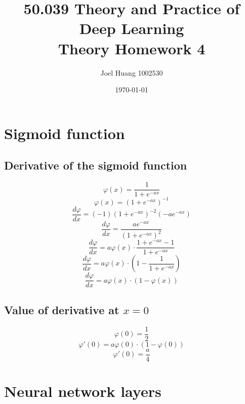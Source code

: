 \documentclass[twocolumn, 9pt]{article}
\title{
	50.039 Theory and Practice of Deep Learning\\
	Theory Homework 4
}
\author{Joel Huang 1002530}
\date{\today}
\begin{document}
\maketitle

\section{Sigmoid function}
\subsection*{Derivative of the sigmoid function}
\begin{equation*}
	\varphi(x) = \dfrac{1}{1+e^{-ax}}
\end{equation*}
\begin{equation*}
	\varphi(x) = (1+e^{-ax})^{-1}
\end{equation*}
\begin{equation*}
	\dfrac{d\varphi}{dx} = (-1)(1+e^{-ax})^{-2}(-ae^{-ax})
\end{equation*}
\begin{equation*}
	\dfrac{d\varphi}{dx} = \dfrac{ae^{-ax}}{(1+e^{-ax})^2}
\end{equation*}
\begin{equation*}
	\dfrac{d\varphi}{dx} = a\varphi(x)\cdot \dfrac{1+e^{-ax}-1}{1+e^{-ax}}
\end{equation*}
\begin{equation*}
	\dfrac{d\varphi}{dx} = a\varphi(x)\cdot (1-\dfrac{1}{1+e^{-ax}})
\end{equation*}
\begin{equation*}
	\dfrac{d\varphi}{dx} = a\varphi(x)\cdot (1-\varphi(x))
\end{equation*}

\subsection*{Value of derivative at $x=0$}
\begin{equation*}
	\varphi(0) = \dfrac{1}{2}
\end{equation*}
\begin{equation*}
	\varphi'(0) = a\varphi(0)\cdot (1-\varphi(0))
\end{equation*}
\begin{equation*}
	\varphi'(0) = \dfrac{a}{4}
\end{equation*}

\section{Neural network layers}
\end{document}
